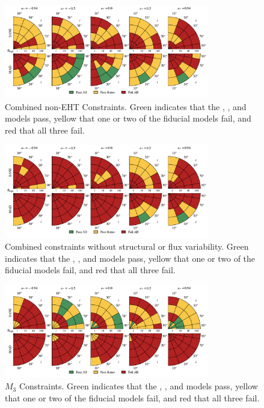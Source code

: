 \begin{figure}
  \centering
  \includegraphics[width=0.8\textwidth]{./figures/Non_Interferometric_Constraints.pdf}
  \caption{Combined non-EHT Constraints.  Green indicates that the \kharma, \bhac, and \hamr models pass, yellow that one or two of the fiducial models fail, and red that all three fail.}
  \label{fig:noneht_pizza}
\end{figure}


\begin{figure}
  \centering
  \includegraphics[width=0.8\textwidth]{./figures/All_Constraints.pdf}
  \caption{Combined constraints without structural or flux variability.  Green indicates that the \kharma, \bhac, and \hamr models pass, yellow that one or two of the fiducial models fail, and red that all three fail.}
  \label{fig:all_pizza_app}
\end{figure}


\begin{figure}
  \centering
  \includegraphics[width=0.8\textwidth]{./figures/230GHz_3Hr_MI_Constraints.pdf}
  \caption{$M_3$ Constraints.  Green indicates that the \kharma, \bhac, and \hamr models pass, yellow that one or two of the fiducial models fail, and red that all three fail.}
  \label{fig:m3_pizza}
\end{figure}

